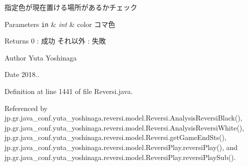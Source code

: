 指定色が現在置ける場所があるかチェック 


\begin{DoxyParams}[1]{Parameters}
\mbox{\tt in}  & {\em int} & color コマ色 \\
\hline
\end{DoxyParams}
\begin{DoxyReturn}{Returns}
0 \+: 成功 それ以外 \+: 失敗 
\end{DoxyReturn}
\begin{DoxyAuthor}{Author}
Yuta Yoshinaga 
\end{DoxyAuthor}
\begin{DoxyDate}{Date}
2018.. 
\end{DoxyDate}


Definition at line 1441 of file Reversi.\+java.



Referenced by jp.\+gr.\+java\+\_\+conf.\+yuta\+\_\+yoshinaga.\+reversi.\+model.\+Reversi.\+Analysis\+Reversi\+Black(), jp.\+gr.\+java\+\_\+conf.\+yuta\+\_\+yoshinaga.\+reversi.\+model.\+Reversi.\+Analysis\+Reversi\+White(), jp.\+gr.\+java\+\_\+conf.\+yuta\+\_\+yoshinaga.\+reversi.\+model.\+Reversi.\+get\+Game\+End\+Sts(), jp.\+gr.\+java\+\_\+conf.\+yuta\+\_\+yoshinaga.\+reversi.\+model.\+Reversi\+Play.\+reversi\+Play(), and jp.\+gr.\+java\+\_\+conf.\+yuta\+\_\+yoshinaga.\+reversi.\+model.\+Reversi\+Play.\+reversi\+Play\+Sub().

